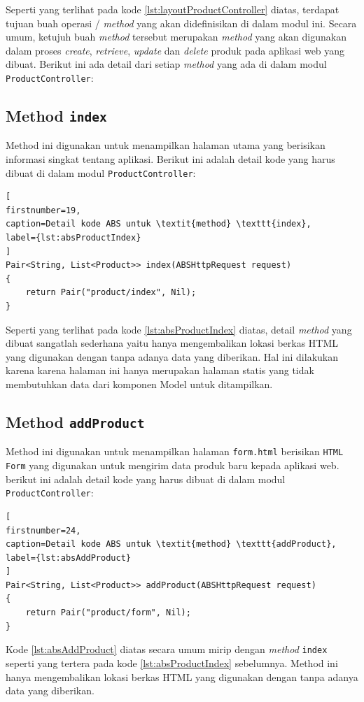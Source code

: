Seperti yang terlihat pada kode \ref{lst:layoutProductController} diatas, terdapat tujuan buah operasi / \textit{method} yang akan didefinisikan di dalam modul ini. Secara umum, ketujuh buah \textit{method} tersebut merupakan \textit{method} yang akan digunakan dalam proses \textit{create}, \textit{retrieve}, \textit{update} dan \textit{delete} produk pada aplikasi web yang dibuat. Berikut ini ada detail dari setiap \textit{method} yang ada di dalam modul \texttt{ProductController}:

\subsection{Method \texttt{index}}
Method ini digunakan untuk menampilkan halaman utama yang berisikan informasi singkat tentang aplikasi. Berikut ini adalah detail kode yang harus dibuat di dalam modul \texttt{ProductController}:

\begin{lstlisting}[
firstnumber=19,
caption=Detail kode ABS untuk \textit{method} \texttt{index},
label={lst:absProductIndex}
]
Pair<String, List<Product>> index(ABSHttpRequest request)
{
	return Pair("product/index", Nil);
}
\end{lstlisting}

Seperti yang terlihat pada kode \ref{lst:absProductIndex} diatas, detail \textit{method} yang dibuat sangatlah sederhana yaitu hanya mengembalikan lokasi berkas HTML yang digunakan dengan tanpa adanya data yang  diberikan. Hal ini dilakukan karena karena halaman ini hanya merupakan halaman statis yang tidak membutuhkan data dari komponen Model untuk ditampilkan.

\subsection{Method \texttt{addProduct}}
Method ini digunakan untuk menampilkan halaman \texttt{form.html} berisikan \texttt{HTML Form} yang digunakan untuk mengirim data produk baru kepada aplikasi web. berikut ini adalah detail kode yang harus dibuat di dalam modul \texttt{ProductController}:

\begin{lstlisting}[
firstnumber=24,
caption=Detail kode ABS untuk \textit{method} \texttt{addProduct},
label={lst:absAddProduct}
]
Pair<String, List<Product>> addProduct(ABSHttpRequest request)
{
	return Pair("product/form", Nil);
}
\end{lstlisting}

Kode \ref{lst:absAddProduct} diatas secara umum mirip dengan \textit{method} \texttt{index} seperti yang tertera pada kode \ref{lst:absProductIndex} sebelumnya. Method ini hanya mengembalikan lokasi berkas HTML yang digunakan dengan tanpa adanya data yang diberikan. 

